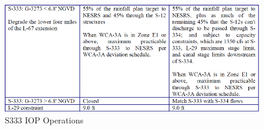 
\begin{figure}[!h]
  \begin{center}
  \includegraphics[width=6.5in]{../figs/S333_IOPops.png}
  \caption{S333 IOP Operations}
  \label{fig:S333iop}
  \end{center}
\end{figure}

